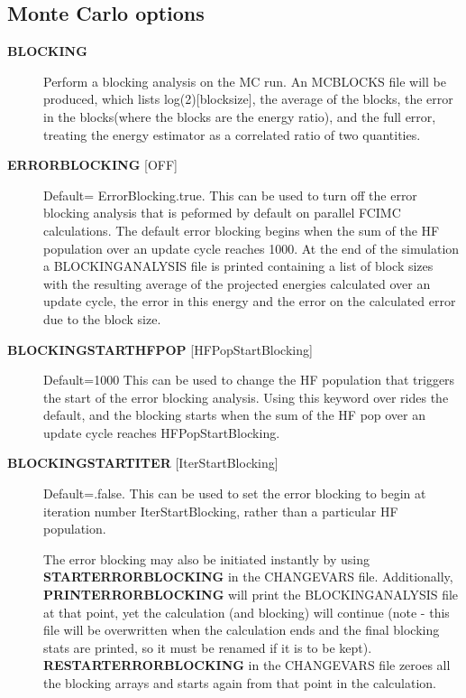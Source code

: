 \documentclass[openany,a4paper,10pt,english]{manual}
\begin{document}
\subsection{Monte Carlo options}
\begin{description}
\item[\textbf{BLOCKING}] \leavevmode
Perform a blocking analysis on the MC run.  An MCBLOCKS file will be
produced, which lists log(2){[}blocksize{]}, the average of the blocks,
the error in the blocks(where the blocks are the energy ratio),
and the full error, treating the energy estimator as a correlated
ratio of two quantities.

\item[\textbf{ERRORBLOCKING} {[}OFF{]}] \leavevmode
Default= ErrorBlocking.true.
This can be used to turn off the error blocking analysis that is peformed
by default on parallel FCIMC calculations.  The default error blocking
begins when the sum of the HF population over an update cycle reaches 1000.
At the end of the simulation a BLOCKINGANALYSIS file is printed containing
a list of block sizes with the resulting average of the projected energies
calculated over an update cycle, the error in this energy and the error on
the calculated error due to the block size.

\item[\textbf{BLOCKINGSTARTHFPOP} {[}HFPopStartBlocking{]}] \leavevmode
Default=1000
This can be used to change the HF population that triggers the start of the
error blocking analysis.  Using this keyword over rides the default, and
the blocking starts when the sum of the HF pop over an update cycle reaches
HFPopStartBlocking.

\item[\textbf{BLOCKINGSTARTITER} {[}IterStartBlocking{]}] \leavevmode
Default=.false.
This can be used to set the error blocking to begin at iteration number
IterStartBlocking, rather than a particular HF population.

The error blocking may also be initiated instantly by using \textbf{STARTERRORBLOCKING}
in the CHANGEVARS file.  Additionally, \textbf{PRINTERRORBLOCKING} will print the
BLOCKINGANALYSIS file at that point, yet the calculation (and blocking) will
continue (note - this file will be overwritten when the calculation ends and the
final blocking stats are printed, so it must be renamed if it is to be kept).
\textbf{RESTARTERRORBLOCKING} in the CHANGEVARS file zeroes all the
blocking arrays and starts again from that point in the calculation.


\end{description}
\end{document}
